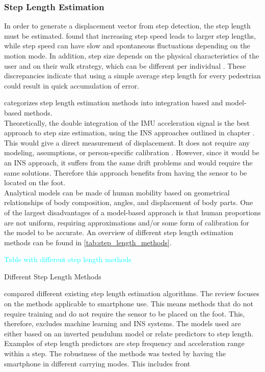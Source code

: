 

\subsubsection{Step Length Estimation}
In order to generate a displacement vector from step detection, the step length must be estimated. \citet{Collins2013a} found that increasing step speed leads to larger step lengths, while step speed can have slow and spontaneous fluctuations depending on the motion mode. In addition, step size depends on the physical characteristics of the user and on their walk strategy, which can be different per individual \cite{Diez2018}. These discrepancies indicate that using a simple average step length for every pedestrian could result in quick accumulation of error. 

\citet{Diez2018} categorizes step length estimation methods into integration based and model-based methods. \\
Theoretically, the double integration of the IMU acceleration signal is the best approach to step size estimation, using the INS approaches outlined in chapter . This would give a direct measurement of displacement. It does not require any modeling, assumptions, or person-specific calibration \cite{Diez2018}. However, since it would be an INS approach, it suffers from the same drift problems and would require the same solutions. Therefore this approach benefits from having the sensor to be located on the foot. \\
Analytical models can be made of human mobility based on geometrical relationships of body composition, angles, and displacement of body parts. One of the largest disadvantages of a model-based approach is that human proportions are not uniform, requiring approximations and/or some form of calibration for the model to be accurate.
An overview of different step length estimation methods can be found in \cref{tab:step_length_methods}.

\begin{table}[H]
	\centering
	\textcolor{cyan}{Table with different step length methods}
	\caption{Different Step Length Methods}
	\label{tab:step_length_methods}
\end{table}

\citet{Vezocnik2019} compared different existing step length estimation algorithms. The review focuses on the methods applicable to smartphone use. This means methods that do not require training and do not require the sensor to be placed on the foot. This, therefore, excludes machine learning and INS systems. The models used are either based on an inverted pendulum model or relate predictors to step length. Examples of step length predictors are step frequency and acceleration range within a step. The robustness of the methods was tested by having the smartphone in different carrying modes. This includes front 

